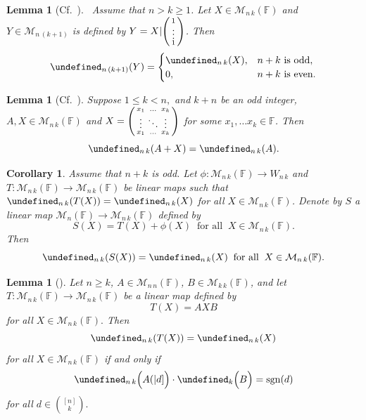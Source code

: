 \documentclass{elsarticle}
\def\F{{\mathbb F}}
\def\M{{\mathcal M}}
\let\det\undefined
\DeclareMathOperator{\det}{det}
\DeclareMathOperator{\sgn}{sgn}
\newenvironment{psmallmatrix}
  {\left(\begin{smallmatrix}}
  {\end{smallmatrix}\right)}
\theoremstyle{plain}
\newtheorem{lemma}[theorem]{Lemma}
\newtheorem{corollary}[theorem]{Corollary}
\theoremstyle{definition}
\numberwithin{equation}{section}
\begin{document}
\begin{lemma}[Cf.~{\cite[Lemma~20]{NAKAGAMI2007422}}]~\label{lem:NAKAGAMILEMMA20} Assume that $n > k \ge 1$. Let  $X \in \M_{n\,k}(\F)$ and $Y \in \M_{n\,(k+1)}$ is defined by $Y = X | \begin{psmallmatrix}1 \\ \vdots \\ 1\end{psmallmatrix}$. Then
\[
\det_{n\,(k+1)}(Y) = \begin{cases}
\det_{n\,k}(X), & \mbox{$n + k$ is odd},\\
0, & \mbox{$n + k$ is even}.
\end{cases}
\]
\end{lemma}


\begin{lemma}[{Cf.~\cite[Theorem~3.3]{amiri2010}}]\label{lem:AdditionNPLusKOdd}
{Suppose $1 \le k < n,$ and $k + n$ be an odd integer, $A, X \in \M_{n\, k}(\F)$ and $X = \begin{psmallmatrix}
x_1 & \ldots & x_k\\
\vdots & \ddots & \vdots\\
x_1 & \ldots & x_k
\end{psmallmatrix}$ for some $x_1,\ldots x_k \in \F$. Then}
\[
\det_{n\,k} (A + X) = \det_{n\,k} (A).
\]
\end{lemma}


\begin{corollary}\label{cor:AdditionLinearMapNPLusKOdd}Assume that $n + k$ is odd. Let 
$\phi \colon \M_{n\,k}(\F) \to W_{n\,k}$ and $T \colon \M_{n\,k}(\F) \to \M_{n\,k}(\F)$ be linear maps such that  $\det_{n\, k} (T(X)) = \det_{n\,k}(X)$ for all $X \in \M_{n\,k}(\F)$. Denote by $S$ a linear map $\M_{n}(\F) \to \M_{n\,k}(\F)$ defined by
\begin{equation}\label{eq:AddingKernel}
S(X) = T(X) + \phi (X)\;\;\mbox{for all}\;\;X \in \M_{n\,k}(\F).
\end{equation}
 Then
\[
\det_{n\, k} (S(X)) = \det_{n\,k}(X)\;\;\mbox{for all}\;\;X \in \M_{n\,k} (\F).
\]
\end{corollary}

\begin{lemma}[{\cite[Lemma~3.1]{Guterman2025}}]\label{lem:TwoSidedMulPreservesDet}Let $n \ge k$, $A \in \M_{n\,n}(\F)$, $B \in \M_{k\,k}(\F)$, and let $T\colon \M_{n\,k}(\F) \to \M_{n\,k}(\F)$ be a linear map defined by
\begin{equation}\label{eq:TwoSideMul}
T(X) = AXB
\end{equation}
for all $X \in \M_{n\,k}(\F).$ Then
\[
\det_{n\,k} (T(X)) = \det_{n\,k}(X)
\]
for all $X \in \M_{n\,k} (\F)$ if and only if
\begin{equation}\label{eq:TwoSideMul2}
\det_{n\,k} \Bigl(A(|d]\Bigr)\cdot \det_k \Bigl(B\Bigr) =  \sgn (d)
\end{equation}
for all $d \in \binom{[n]}{k}.$
\end{lemma}
\end{document}
